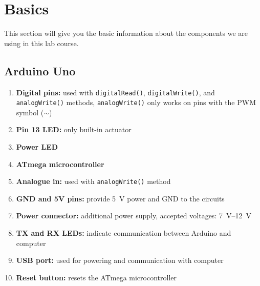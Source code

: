 \newpage
\section{Basics}
This section will give you the basic information about the components we are using in this lab course.
%
\subsection{Arduino Uno}\label{sec:uno}
%
%
\begin{enumerate}
  \item \textbf{Digital pins:}      used with \texttt{digitalRead()}, \texttt{digitalWrite()}, and \texttt{analogWrite()} methods, \texttt{analogWrite()} only works on pins with the \ac{PWM} symbol ($\sim$)
  \item \textbf{Pin 13 LED:}        only built-in actuator
  \item \textbf{Power LED}
  \item \textbf{ATmega microcontroller}
  \item \textbf{Analogue in:}       used with \texttt{analogWrite()} method  
  \item \textbf{GND and 5V pins:}   provide \SI[retain-explicit-plus]{5}{\volt} power and \ac{GND} to the circuits
  \item \textbf{Power connector:}   additional power supply, accepted voltages: \SIrange{7}{12}{\volt}
  \item \textbf{TX and RX LEDs:}    indicate communication between Arduino and computer
  \item \textbf{USB port:} used     for powering and communication with computer
  \item \textbf{Reset button:}      resets the ATmega microcontroller
\end{enumerate}
%
